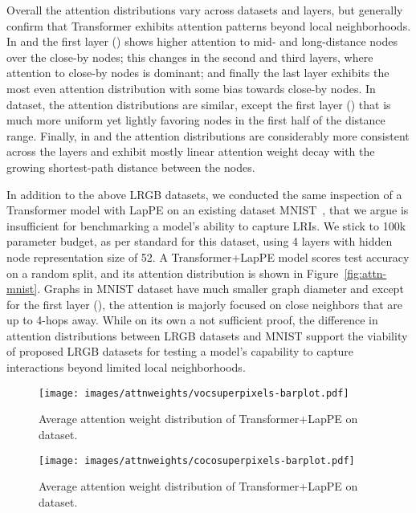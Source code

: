 \documentclass{article}
\begin{document}
Overall the attention distributions vary across datasets and layers, but generally confirm that Transformer exhibits attention patterns beyond local neighborhoods. In \pascal and \coco the first layer () shows higher attention to mid- and long-distance nodes over the close-by nodes; this changes in the second and third layers, where attention to close-by nodes is dominant; and finally the last layer exhibits the most even attention distribution with some bias towards close-by nodes. In \pcqmcontact dataset, the attention distributions are similar, except the first layer () that is much more uniform yet lightly favoring nodes in the first half of the distance range. Finally, in \pepfunc and \pepstruct the attention distributions are considerably more consistent across the layers and exhibit mostly linear attention weight decay with the growing shortest-path distance between the nodes.

In addition to the above LRGB datasets, we conducted the same inspection of a Transformer model with LapPE on an existing dataset MNIST~\cite{dwivedi2020benchmarking}, that we argue is insufficient for benchmarking a model's ability to capture LRIs. We stick to 100k parameter budget, as per standard for this dataset, using 4 layers with hidden node representation size of 52. A Transformer+LapPE model scores  test accuracy on a random split, and its attention distribution is shown in Figure~\ref{fig:attn-mnist}. Graphs in MNIST dataset have much smaller graph diameter and except for the first layer (), the attention is majorly focused on close neighbors that are up to 4-hops away. While on its own a not sufficient proof, the difference in attention distributions between LRGB datasets and MNIST support the viability of proposed LRGB datasets for testing a model's capability to capture interactions beyond limited local neighborhoods.

\begin{figure}[ht]
    \centering
\texttt{[image: images/attnweights/vocsuperpixels-barplot.pdf]}
\caption{Average attention weight distribution of Transformer+LapPE on \pascal dataset.}
\label{fig:attn-pascal}
\end{figure}


\begin{figure}[ht]
    \centering
\texttt{[image: images/attnweights/cocosuperpixels-barplot.pdf]}
\caption{Average attention weight distribution of Transformer+LapPE on \coco dataset.}
\label{fig:attn-coco}
\end{figure}
\end{document}
